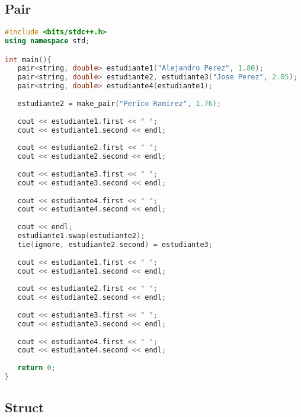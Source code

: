 \subsection{Pair}

\begin{lstlisting}[language=C++]
#include <bits/stdc++.h>
using namespace std;

int main(){
   pair<string, double> estudiante1("Alejandro Perez", 1.80);
   pair<string, double> estudiante2, estudiante3("Jose Perez", 2.05);
   pair<string, double> estudiante4(estudiante1);
   
   estudiante2 = make_pair("Perico Ramirez", 1.76);
   
   cout << estudiante1.first << " ";
   cout << estudiante1.second << endl;
   
   cout << estudiante2.first << " ";
   cout << estudiante2.second << endl;
   
   cout << estudiante3.first << " ";
   cout << estudiante3.second << endl;
   
   cout << estudiante4.first << " ";
   cout << estudiante4.second << endl;
   
   cout << endl;
   estudiante1.swap(estudiante2);
   tie(ignore, estudiante2.second) = estudiante3;
   
   cout << estudiante1.first << " ";
   cout << estudiante1.second << endl;
   
   cout << estudiante2.first << " ";
   cout << estudiante2.second << endl;
   
   cout << estudiante3.first << " ";
   cout << estudiante3.second << endl;
   
   cout << estudiante4.first << " ";
   cout << estudiante4.second << endl;
	
   return 0;
}
\end{lstlisting}


\subsection{Struct}


